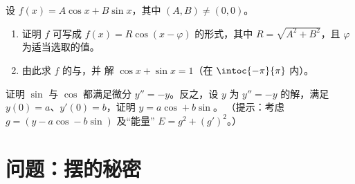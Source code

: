 \begin{exercise}[$\star\star\star$]\label{exo:g12:trigo:8}
设 $f(x) = A\cos x + B \sin x$，其中 $(A,B) \neq (0,0)$。
\begin{enumerate}
  \item 证明 $f$ 可写成 $f(x) = R\cos(x - \varphi)$ 的形式，其中
        $R = \sqrt{A^2 + B^2}$，且 $\varphi$ 为适当选取的值。
  \item 由此求 $f$ 的与，并
        解 $\cos x + \sin x = 1$（在 $\intoc{-\pi}{\pi}$ 内）。
\end{enumerate}
\end{exercise}

\begin{exercise}[$\star\star\star$]\label{exo:g12:trigo:9}
证明 $\sin$ 与 $\cos$ 都满足微分
$y'' = -y$。反之，设 $y$ 为 $y'' = -y$ 的解，满足
$y(0) = a$、$y'(0) = b$，证明 $y = a\cos + b\sin$。
（提示：考虑 $g = (y - a\cos - b\sin)$ 及“能量”
$E = g^2 + (g')^2$。）
\end{exercise}

\section{问题：摆的秘密}

